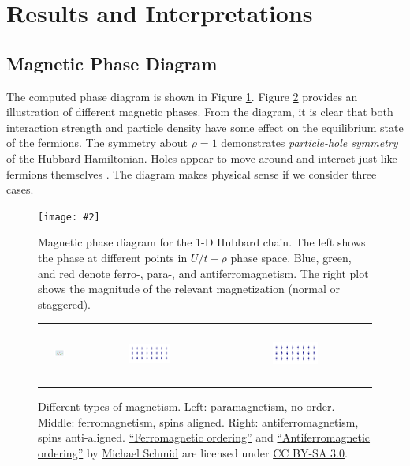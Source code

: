 \documentclass{article}
\newcommand{\nicegraphic}[2][1]{
	\begin{center}
		\texttt{[image: \#2]}
	\end{center}
}
\begin{document}
\section{Results and Interpretations}
\subsection{Magnetic Phase Diagram}
The computed phase diagram is shown in Figure \ref{fig:phase}. Figure \ref{fig:magnetism} provides an illustration of different magnetic phases. From the diagram, it is clear that both interaction strength and particle density have some effect on the equilibrium state of the fermions. The symmetry about $\rho = 1$ demonstrates \textit{particle-hole symmetry} of the Hubbard Hamiltonian. Holes appear to move around and interact just like fermions themselves \cite{scalettar}. The diagram makes physical sense if we consider three cases.

\begin{figure}[h]
\nicegraphic[0.9]{fermi_hubbard_phase_diagram}
\caption{Magnetic phase diagram for the 1-D Hubbard chain. The left shows the phase at different points in $U/t-\rho$ phase space. Blue, green, and red denote ferro-, para-, and antiferromagnetism. The right plot shows the magnitude of the relevant magnetization (normal or staggered).}
\label{fig:phase}
\end{figure}

\begin{figure}[h]
\begin{tabular}{ccc}
\includegraphics[width=0.32\textwidth,height=5em]{paramagnetism} & \includegraphics[width=0.32\textwidth]{ferromagnetism} & \includegraphics[width=0.32\textwidth]{antiferromagnetism}
\end{tabular}
\caption{Different types of magnetism. Left: paramagnetism, no order. Middle: ferromagnetism, spins aligned. Right: antiferromagnetism, spins anti-aligned. \href{https://commons.wikimedia.org/wiki/File:Ferromagnetic_ordering.svg}{``Ferromagnetic ordering''} and \href{https://commons.wikimedia.org/wiki/File:Antiferromagnetic_ordering.svg}{``Antiferromagnetic ordering''} by \href{https://commons.wikimedia.org/wiki/User:Schmid}{Michael Schmid} are licensed under \href{https://creativecommons.org/licenses/by-sa/3.0/deed.en}{CC BY-SA 3.0}.}
\label{fig:magnetism}
\end{figure}
\end{document}
